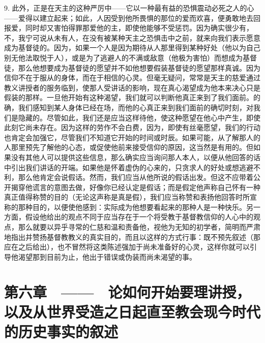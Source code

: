 9. 此外，正是在天主的这种严厉中——它以一种最有益的恐惧震动必死之人的心——爱得以建立起来；如此，人因受到他所畏惧的那位的爱而欢喜，便勇敢地去回报爱，同时却又害怕得罪那爱他的主，即使他能够不受惩罚。因为确实很少有，不，我宁可说从未有人，在没有被某种天主之恐惧击中之前，就来向我们表示愿意成为基督徒的。因为，如果一个人是因为期待从人那里得到某种好处（他以为自己别无他法取悦于人），或是为了逃避人的不满或敌意（他极为害怕）而想成为基督徒，那么他想要成为基督徒的愿望并不如他想要假装基督徒的愿望那样真诚。因为信仰不在于服从的身体，而在于相信的心灵。但毫无疑问，常常是天主的慈爱通过教义讲授者的服务临到，使那人受讲话的影响，现在真心渴望成为他本来决心只是假装的那样。一旦他开始有这种渴望，我们就可以判断他真正来到了我们面前。的确，我们感知到某人身体已经在场，而他的心真正来到我们面前的确切时刻，对我们是隐藏的。尽管如此，我们还是应当这样待他，使这种愿望在他心中产生，即使此刻它尚未存在。因为这样的劳作不会白费，因为，即使有丝毫愿望，我们的行动也肯定会加强它，尽管我们不知道它开始的时间或时辰。如果可能，从了解那人的人那里预先了解他的心态，或促使他前来接受信仰的原因，这当然是有用的。但如果没有其他人可以提供这些信息，那么确实应当询问那人本人，以便从他回答的话中引出我们讲话的开端。如果他是怀着虚伪的心来的，只贪求人的好处或想逃避不利，那么他肯定会说假话。然而，我们应当从他所说的假话出发。但这不应带着公开揭穿他谎言的意图去做，好像你已经认定是假话；而是假定他声称自己怀有一种真正值得称赞的目的（无论这声称是真是假），我们应当称赞和表扬他回答时所宣称的那种目的，以便使他感到：实际成为他想要看起来的那种人是一种快乐。另一方面，假设他给出的观点不同于应当存在于一个将受教于基督教信仰的人心中的观点，那么就要以异乎寻常的仁慈和温和责备他，视他为无知的初学者，简明而严肃地指出并赞扬基督教教义的真实目的，而且以这样的方式行事：既不预先叙述（那应在之后给出），也不冒然将这类陈述强加于尚未准备好的心灵，这样你就可以引导他渴望那到目前为止，他出于错误或伪装而尚未渴望的事。\par


\section{第六章　——　论如何开始要理讲授，以及从世界受造之日起直至教会现今时代的历史事实的叙述}

